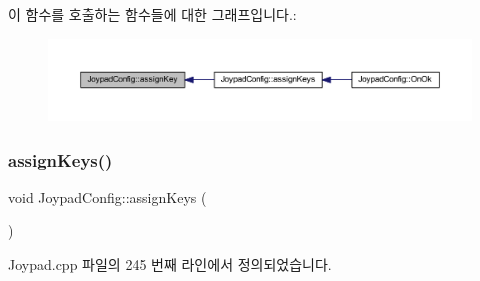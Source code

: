 이 함수를 호출하는 함수들에 대한 그래프입니다.\+:
\nopagebreak
\begin{figure}[H]
\begin{center}
\leavevmode
\includegraphics[width=350pt]{class_joypad_config_a6fe836465dc6d861d96691c03ad0a636_icgraph}
\end{center}
\end{figure}
\mbox{\label{class_joypad_config_a37ced249f71ab247733787e07085e295}} 
\subsubsection{\texorpdfstring{assign\+Keys()}{assignKeys()}}
{\footnotesize\ttfamily void Joypad\+Config\+::assign\+Keys (\begin{DoxyParamCaption}{ }\end{DoxyParamCaption})}



Joypad.\+cpp 파일의 245 번째 라인에서 정의되었습니다.


